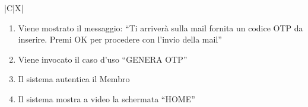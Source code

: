 \begin{tabularx}{\textwidth}{|C|X|}
{\begin{enumerate}
\begin{enumerate}
\begin{enumerate}
            \item Il Membro ricompila il campo
            \item Il Membro preme il pulsante ``ACCEDI''
        \end{enumerate}
        \item \textbf{ALTRIMENTI}:
        \begin{enumerate}
            \item Il sistema interroga il DBMS per ottenere il Membro che possiede la coppia di credenziali inserite
            \item Il sistema effettua il controllo sull'esistenza del Membro
            \item \textbf{SE} non esiste un Membro con tali credenziali:
            \begin{enumerate}
                \item Il sistema mostra a video l'errore: ``Errore: email o password sbagliata, riprova''
                \item Il Membro ricompila i campi
                \item Il Membro clicca il pulsante ``ACCEDI''
            \end{enumerate}
        \end{enumerate}
        \item Il sistema controlla i valori inseriti
    \end{enumerate}
    \item Viene mostrato il messaggio: ``Ti arriver\`a sulla mail fornita un codice OTP da inserire. Premi OK per procedere con l'invio della mail''
    \item Viene invocato il caso d'uso ``GENERA OTP''
    \item Il sistema autentica il Membro
    \item Il sistema mostra a video la schermata ``HOME''
\end{enumerate}
}
\end{tabularx}

